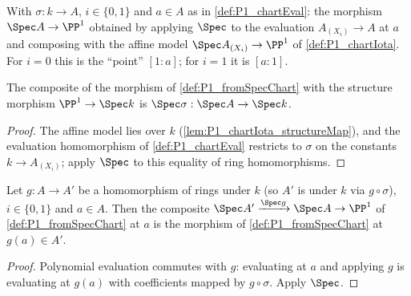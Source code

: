 \begin{definition}
  \label{def:P1_fromSpecChart}
  \leanok
  With \(\sigma : k \to A\), \(i \in \{0,1\}\) and \(a \in A\) as in
  \ref{def:P1_chartEval}: the morphism \(\Spec A \to \PP^1\) obtained by applying
  \(\Spec\) to the evaluation \(A_{(X_i)} \to A\) at \(a\) and composing with the affine
  model \(\Spec A_{(X_i)} \to \PP^1\) of \ref{def:P1_chartIota}. For \(i = 0\) this is the
  ``point'' \([1 : a]\); for \(i = 1\) it is \([a : 1]\).
\end{definition}

\begin{lemma}
  \label{lem:P1_fromSpecChart_over}
  \leanok
  The composite of the morphism of \ref{def:P1_fromSpecChart} with the structure morphism
  \(\PP^1 \to \Spec k\) is \(\Spec \sigma : \Spec A \to \Spec k\).
\end{lemma}
\begin{proof}
  \leanok
  The affine model lies over \(k\) (\ref{lem:P1_chartIota_structureMap}), and the
  evaluation homomorphism of \ref{def:P1_chartEval} restricts to \(\sigma\) on the constants
  \(k \to A_{(X_i)}\); apply \(\Spec\) to this equality of ring homomorphisms.
\end{proof}

\begin{lemma}
  \label{lem:P1_fromSpecChart_natural}
  \leanok
  Let \(g : A \to A'\) be a homomorphism of rings under \(k\) (so \(A'\) is under \(k\)
  via \(g \circ \sigma\)), \(i \in \{0,1\}\) and \(a \in A\). Then the composite
  \(\Spec A' \xrightarrow{\Spec g} \Spec A \to \PP^1\) of \ref{def:P1_fromSpecChart} at
  \(a\) is the morphism of \ref{def:P1_fromSpecChart} at \(g(a) \in A'\).
\end{lemma}
\begin{proof}
  \leanok
  Polynomial evaluation commutes with \(g\): evaluating at \(a\) and applying \(g\) is
  evaluating at \(g(a)\) with coefficients mapped by \(g \circ \sigma\). Apply \(\Spec\).
\end{proof}

